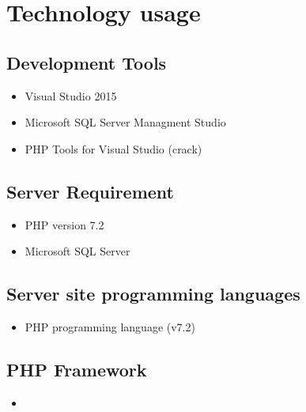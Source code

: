 \documentclass[letterpaper,10pt,english,openany,oneside]{sphinxmanual}
\begin{document}
\chapter{Technology usage}
\label{\detokenize{technology/technology:technology-usage}}\label{\detokenize{technology/technology::doc}}

\section{Development Tools}
\label{\detokenize{technology/technology:development-tools}}\begin{itemize}
\item {} 
\sphinxAtStartPar
Visual Studio 2015

\item {} 
\sphinxAtStartPar
Microsoft SQL Server Managment Studio

\item {} 
\sphinxAtStartPar
PHP Tools for Visual Studio (crack)

\end{itemize}


\section{Server Requirement}
\label{\detokenize{technology/technology:server-requirement}}\begin{itemize}
\item {} 
\sphinxAtStartPar
PHP version 7.2

\item {} 
\sphinxAtStartPar
Microsoft SQL Server

\end{itemize}


\section{Server site programming languages}
\label{\detokenize{technology/technology:server-site-programming-languages}}\begin{itemize}
\item {} 
\sphinxAtStartPar
PHP programming language (v7.2)

\end{itemize}


\section{PHP Framework}
\label{\detokenize{technology/technology:php-framework}}\begin{itemize}
\item {} 
\sphinxAtStartPar
{}

\end{itemize}
\end{document}
